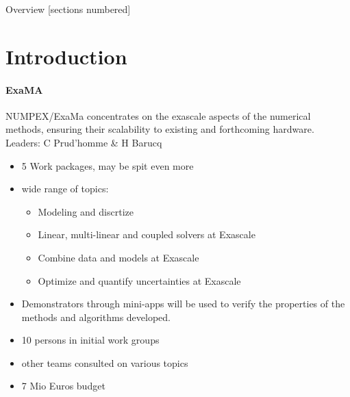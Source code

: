 \titleframe

\begin{frame}{Overview}
  [sections numbered]
  \tableofcontents[hideallsubsections]
\end{frame}


\section{Introduction}
\begin{frame}{\insertsectionhead}
  \framesubtitle{ExaMA}
  NUMPEX/ExaMa concentrates on the exascale aspects of the numerical methods, ensuring their scalability to existing and forthcoming hardware.
  \vfill
  Leaders: C Prud'homme \& H Barucq
  \begin{itemize}
    \item 5 Work packages, may be spit even more
    \item wide range of topics: 
    \begin{itemize}
        \item Modeling and discrtize
        \item  Linear, multi-linear and coupled solvers at Exascale
        \item Combine data and  models at Exascale
        \item Optimize and quantify uncertainties at Exascale
    \end{itemize}
    \item Demonstrators through mini-apps will be used to verify the properties of the methods and algorithms developed.
    
  \end{itemize}
\end{frame}
\begin{frame}{\insertsectionhead}
    
   \begin{itemize}
    \item 10 persons in initial work groups
    \item other teams consulted on various topics 
    \item 7 Mio Euros budget
\end{itemize} 
\end{frame}


